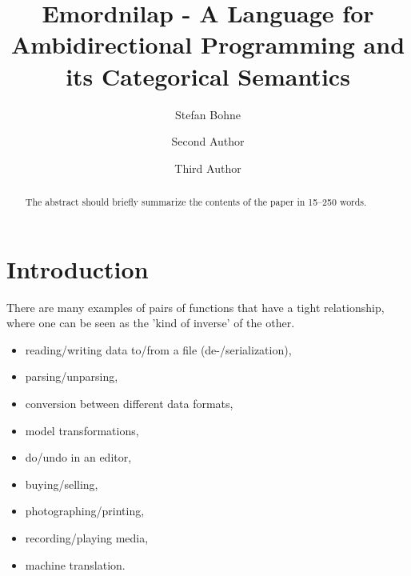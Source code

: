 \documentclass[runningheads,envcountsame]{llncs}
\begin{document}
%
\title{Emordnilap - A Language for Ambidirectional Programming and its Categorical Semantics}
%
%
\author{Stefan Bohne \and
Second Author \and
Third Author}
%
%
%
\maketitle              %
%
\begin{abstract}
The abstract should briefly summarize the contents of the paper in
15--250 words.

\end{abstract}




\maketitle

\section{Introduction}

    There are many examples of pairs of functions that have a tight relationship, where one can be seen as the 'kind of inverse' of the other.
    \begin{itemize}
    \item reading/writing data to/from a file (de-/serialization),
    \item parsing/unparsing,
    \item conversion between different data formats,
    \item model transformations,
    \item do/undo in an editor,
    \item buying/selling,
    \item photographing/printing,
    \item recording/playing media,
    \item machine translation.
    \end{itemize}
    
\end{document}
